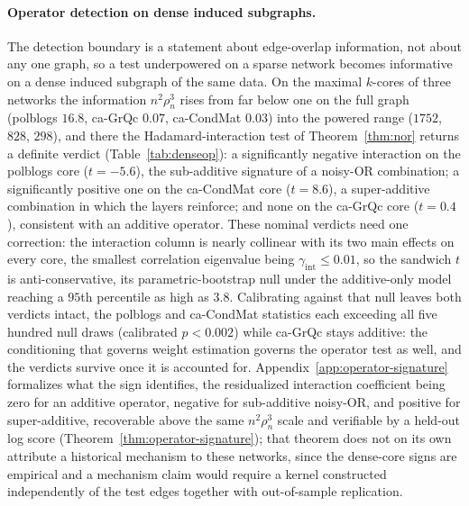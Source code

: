 \documentclass[12pt]{article}
\newcommand{\1}{\mathbf{1}}
\begin{document}
\paragraph{Operator detection on dense induced subgraphs.} The detection boundary is a statement about
edge-overlap information, not about any one graph, so a test underpowered on a sparse network becomes
informative on a dense induced subgraph of the same data. On the maximal $k$-cores of three networks the
information $n^2\rho_n^3$ rises from far below one on the full graph (\textsf{polblogs} $16.8$, \textsf{ca-GrQc}
$0.07$, \textsf{ca-CondMat} $0.03$) into the powered range ($1752$, $828$, $298$), and there the
Hadamard-interaction test of Theorem~\ref{thm:nor} returns a definite verdict (Table~\ref{tab:denseop}): a
significantly negative interaction on the \textsf{polblogs} core ($t=-5.6$), the sub-additive signature of a
noisy-OR combination; a significantly positive one on the \textsf{ca-CondMat} core ($t=8.6$), a super-additive
combination in which the layers reinforce; and none on the \textsf{ca-GrQc} core ($t=0.4$), consistent with an
additive operator. These nominal verdicts need one correction: the interaction column is nearly collinear with
its two main effects on every core, the smallest correlation eigenvalue being $\gamma_{\mathrm{int}}\le0.01$,
so the sandwich $t$ is anti-conservative, its parametric-bootstrap null under the additive-only model reaching
a $95$th percentile as high as $3.8$. Calibrating against that null leaves both verdicts intact, the
\textsf{polblogs} and \textsf{ca-CondMat} statistics each exceeding all five hundred null draws (calibrated
$p<0.002$) while \textsf{ca-GrQc} stays additive: the conditioning that governs weight estimation governs the
operator test as well, and the verdicts survive once it is accounted for. Appendix~\ref{app:operator-signature}
formalizes what the sign identifies, the residualized interaction coefficient being zero for an additive
operator, negative for sub-additive noisy-OR, and positive for super-additive, recoverable above the same
$n^2\rho_n^3$ scale and verifiable by a held-out log score (Theorem~\ref{thm:operator-signature}); that theorem
does not on its own attribute a historical mechanism to these networks, since the dense-core signs are
empirical and a mechanism claim would require a kernel constructed independently of the test edges together
with out-of-sample replication.
\end{document}
